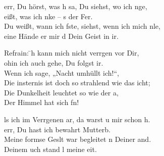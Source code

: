 
err, Du hörst, was h sa, Du siehst, wo ich nge,\\
eißt, was ich nke – s der Fer.\\
Du weißt, wann ich fste, siehst, wenn ich mich nle,\\
eine Hände er mir d Dein Geist in ir.\\

\begin{tabbing}
Refrain: \=  h kann mich nicht verrgen vor Dir,\\
         \>     ohin ich auch gehe, Du folgst ir.\\
         \>               Wenn ich sage, „Nacht umhüllt ich!“,\\
         \>               Die insternis ist doch so strahlend wie das icht;\\
         \>               Die Dunkelheit leuchtet so wie der a,\\
         \>               Der Himmel hat sich fn!\\
\end{tabbing}

ls ich im Verrgenen ar, da warst u mir schon h.\\
err, Du hast ich bewahrt  Mutterb.\\
Meine formse Geslt war begleitet n Deiner and.\\
 Deinem uch stand l meine eit.\\


